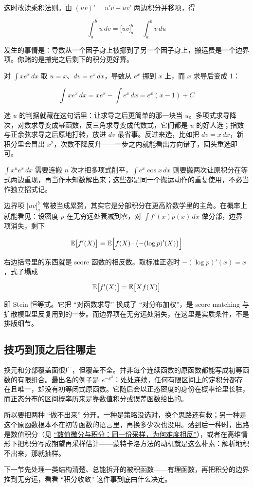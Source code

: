 这时改读乘积法则。由 \((uv)'=u'v+uv'\) 两边积分并移项，得

\[
\int_a^b u\,dv=\bigl[uv\bigr]_a^b-\int_a^b v\,du
\]

发生的事情是：导数从一个因子身上被挪到了另一个因子身上，搬运费是一个边界项。你赌的是搬完之后剩下的积分更好算。

对 \(\int x e^x\,dx\) 取 \(u=x\)、\(dv=e^x\,dx\)，导数从 \(e^x\) 挪到 \(x\) 上，而 \(x\) 求导后变成 1：

\[
\int x e^x\,dx=xe^x-\int e^x\,dx=e^x(x-1)+C
\]

选 \(u\) 的判据就藏在这句话里：让求导之后更简单的那一块当 \(u\)。多项式求导降次，对数求导变成幂函数，反三角求导变成代数式，它们都是 \(u\) 的好人选；指数与正余弦求导之后原地打转，放进 \(dv\) 最省事。反过来选，比如把 \(dv=x\,dx\)，新积分里会冒出 \(x^2\)，次数不降反升——一步之内就能看出方向错了，回头重选即可。

\(\int x^n e^x\,dx\) 需要连搬 \(n\) 次才把多项式削平，\(\int e^x\cos x\,dx\) 则要搬两次让原积分在等式两边重现，再当作未知数解出来；这些都是同一个搬运动作的重复使用，不必当作独立招式记。

边界项 \(\bigl[uv\bigr]_a^b\) 常被当成累赘，其实它是分部积分在更高阶数学里的主角。在概率上就能看见：设密度 \(p\) 在无穷远处衰减到零，对 \(\int f'(x)p(x)\,dx\) 做分部，边界项消失，剩下

\[
\mathbb{E}\bigl[f'(X)\bigr]=\mathbb{E}\Bigl[f(X)\cdot\bigl(-(\log p)'(X)\bigr)\Bigr]
\]

右边括号里的东西就是 score 函数的相反数。取标准正态时 \(-(\log p)'(x)=x\)，式子塌成

\[
\mathbb{E}\bigl[f'(X)\bigr]=\mathbb{E}\bigl[X f(X)\bigr]
\]

即 Stein 恒等式。它把 ``对函数求导'' 换成了 ``对分布加权''，是 score matching 与扩散模型里反复用到的一步。而边界项在无穷远处消失，在这里是实质条件，不是排版细节。

\subsection{技巧到顶之后往哪走}

换元和分部覆盖面很广，但覆盖不全。并非每个连续函数的原函数都能写成初等函数的有限组合。最出名的例子是 \(e^{-x^2}\)：处处连续，任何有限区间上的定积分都存在且唯一，却没有初等闭式原函数。它随后会以正态密度的身份在概率论里长驻，而正态分布的区间概率历来是靠数值积分或误差函数给出的。

所以要把两种 ``做不出来'' 分开。一种是策略没选对，换个思路还有救；另一种是这个原函数根本不在初等函数的语言里，再换多少次也没用。落到后一种时，出路是数值积分（见 \hyperref[ch:064]{``数值微分与积分：同一份采样，为何难度相反''}），或者在高维情形下把积分写成期望再采样估计——蒙特卡洛方法的动机就是这么朴素：解析地积不出来，那就抽样。

下一节先处理一类结构清楚、总能拆开的被积函数——有理函数，再把积分的边界推到无穷远，看看 ``积分收敛'' 这件事到底由什么决定。